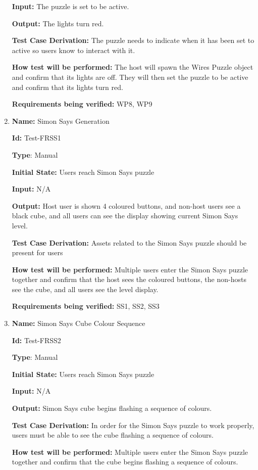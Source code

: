 \documentclass[12pt, titlepage]{article}
\begin{document}
\begin{enumerate}
\textbf{Input:} The puzzle is set to be active.

\textbf{Output:} The lights turn red.

\textbf{Test Case Derivation:} The puzzle needs to indicate when it has been set to active so users know to interact with it. 

\textbf{How test will be performed:} The host will spawn the Wires Puzzle object and confirm that its lights are off. They will then set the puzzle to be active and confirm that its lights turn red.

\textbf{Requirements being verified: } WP8, WP9

\item{\textbf{Name:} Simon Says Generation} \label{itm:Test-FRSS1}

\textbf{Id:} Test-FRSS1

\textbf{Type}: Manual

\textbf{Initial State:} Users reach Simon Says puzzle

\textbf{Input:} N/A

\textbf{Output:} Host user is shown 4 coloured buttons, and non-host users see a black cube, and all users can see the display showing current Simon Says level.

\textbf{Test Case Derivation:} Assets related to the Simon Says puzzle should be present for users

\textbf{How test will be performed:} Multiple users enter the Simon Says puzzle together and confirm that the host sees the coloured buttons, the non-hosts see the cube, and all users see the level display.

\textbf{Requirements being verified: } SS1, SS2, SS3

\item{\textbf{Name:} Simon Says Cube Colour Sequence} \label{itm:Test-FRSS2}

\textbf{Id:} Test-FRSS2

\textbf{Type}: Manual

\textbf{Initial State:} Users reach Simon Says puzzle

\textbf{Input:} N/A

\textbf{Output:} Simon Says cube begins flashing a sequence of colours.

\textbf{Test Case Derivation:} In order for the Simon Says puzzle to work properly, users must be able to see the cube flashing a sequence of colours.

\textbf{How test will be performed:} Multiple users enter the Simon Says puzzle together and confirm that the cube begins flashing a sequence of colours.


\end{enumerate}
\end{document}
